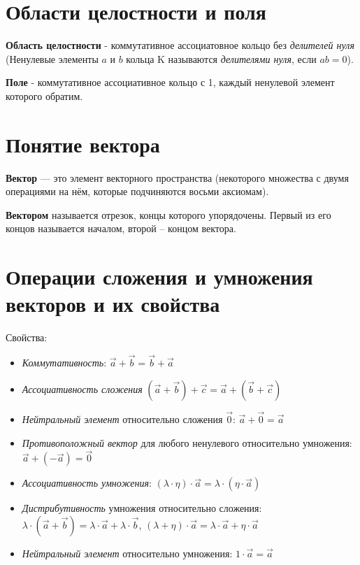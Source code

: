 \documentclass[a4paper]{article}
\begin{document}
{\begin{small}
\section*{Области целостности и поля}
\textbf{Область целостности} - коммутативное ассоциатовное кольцо без \textit{делителей нуля} (Ненулевые элементы $a$ и $b$ кольца K называются \textit{делителями нуля}, если $ab = 0$).

\textbf{Поле} - коммутативное ассоциативное кольцо с 1, каждый ненулевой элемент которого обратим.




\section*{Понятие вектора}
\textbf{Вектор} — это элемент векторного пространства (некоторого множества с двумя операциями на нём, которые подчиняются восьми аксиомам).

\textbf{Вектором} называется отрезок,
концы которого упорядочены. Первый из его концов
называется началом, второй – концом вектора.

\section*{Операции сложения и умножения векторов и их свойства}

Свойства:
\begin{itemize}
\item \textit{Коммутативность}: $\vec{a} + \vec{b} = \vec{b} + \vec{a}$
\item \textit{Ассоциативность сложения} $(\vec{a} + \vec{b}) + \vec{c} = \vec{a} + (\vec{b}+\vec{c})$
\item \textit{Нейтральный элемент} относительно сложения $\vec{0}$: $\vec{a} + \vec{0} = \vec{a}$
\item \textit{Противоположный вектор} для любого ненулевого относительно умножения: $\vec{a}+(-\vec{a}) = \vec{0}$
\item \textit{Ассоциативность умножения}: $(\lambda \cdot \eta) \cdot \vec{a} = \lambda \cdot ( \eta \cdot \vec{a})$
\item \textit{Дистрибутивность} умножения относительно сложения: $\lambda \cdot (\vec{a} + \vec{b}) = \lambda \cdot \vec{a} + \lambda \cdot \vec{b}$, $(\lambda + \eta) \cdot \vec{a} = \lambda \cdot \vec{a} + \eta \cdot \vec{a}$
\item \textit{Нейтральный элемент} относительно умножения: $1 \cdot \vec{a} = \vec{a}$
\end{itemize}

\end{small}}
\end{document}
